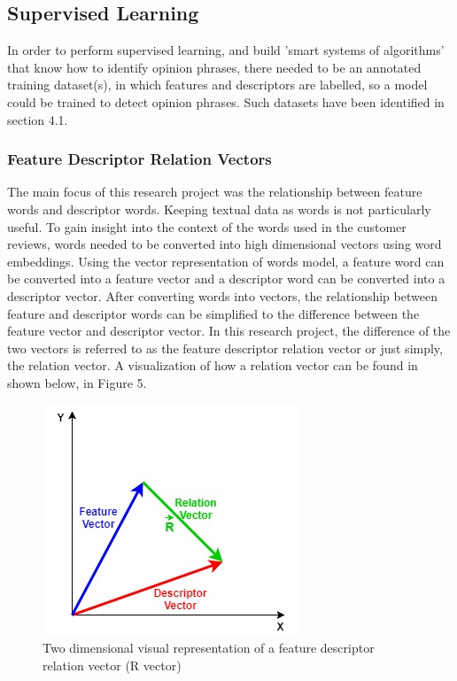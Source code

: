 \documentclass{sig-alternate}
\begin{document}
\subsection{Supervised Learning}
In order to perform supervised learning, and build 'smart systems of algorithms' that know how to identify opinion phrases, there needed to be an annotated training dataset(s), in which features and descriptors are labelled, so a model could be trained to detect opinion phrases. Such datasets have been identified in section 4.1. 

\subsubsection{Feature Descriptor Relation Vectors}
The main focus of this research project was the relationship between feature words and descriptor words. Keeping textual data as words is not particularly useful. To gain insight into the context of the words used in the customer reviews, words needed to be converted into high dimensional vectors using word embeddings. Using the vector representation of words model, a feature word can be converted into a feature vector and a descriptor word can be converted into a descriptor vector. After converting words into vectors, the relationship between feature and descriptor words can be simplified to the difference between the feature vector and descriptor vector. In this research project, the difference of the two vectors is referred to as the feature descriptor relation vector or just simply, the relation vector. A visualization of how a relation vector can be found in shown below, in Figure 5.

\begin{figure}
\centering
\includegraphics[scale=0.60]{images/relation_vec.jpg}
\caption{Two dimensional visual representation of a feature descriptor relation vector (R vector)}
\end{figure}
\end{document}
